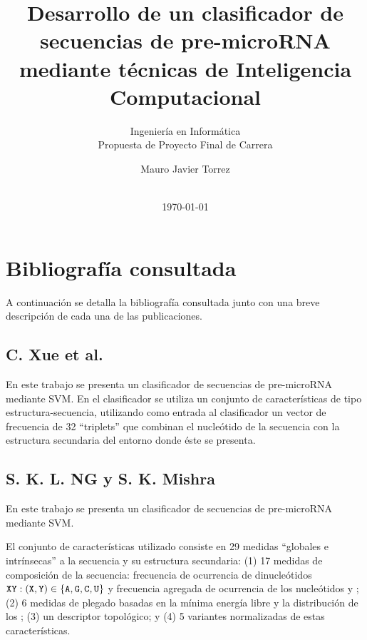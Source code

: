 \documentclass[12pt,bibliography=openstyle,DIV=12,parskip=half-]{scrartcl}
\begin{document}
%
\begin{titlepage}
%
\titlehead{\center Universidad Nacional del Litoral\\
  Facultad de Ingeniería y Ciencias Hídricas}
%
\subtitle{Ingeniería en Informática\\
  Propuesta de Proyecto Final de Carrera}
%
\title{Desarrollo de un clasificador de secuencias de pre-microRNA
  mediante técnicas de Inteligencia Computacional}
\subject{Informe entregable 1}
\author{Mauro Javier Torrez}
%
\publishers{\-\\[4em]{Director\\Dr. Diego H. Milone}\\[2em]
  {Asesora temática\\Dra. Georgina S. Stegmayer}}
%
\date{\-\\[2em]\today}
%
\renewcommand*{\titlepagestyle}{empty}
\maketitle
\end{titlepage}
\setcounter{page}{1}
%
%
%
%
\section{Bibliografía consultada}
%
A continuación se detalla la bibliografía consultada junto con una
breve descripción de cada una de las publicaciones.
%
\subsection{C. Xue et al. \cite{xue}}
%
En este trabajo se presenta un clasificador de secuencias de
pre-microRNA mediante SVM.  En el clasificador se utiliza un conjunto
de características de tipo estructura-secuencia, utilizando como
entrada al clasificador un vector de frecuencia de 32 ``triplets'' que
combinan el nucleótido de la secuencia con la estructura secundaria
del entorno donde éste se presenta.
%
\subsection{S. K. L. NG y S. K. Mishra \cite{ng}}
%
En este trabajo se presenta un clasificador de secuencias de
pre-microRNA mediante SVM.

El conjunto de características utilizado consiste en 29 medidas
``globales e intrínsecas'' a la secuencia y su estructura secundaria:
(1) 17 medidas de composición de la secuencia: frecuencia de
ocurrencia de dinucleótidos
${\tt XY}:({\tt X},{\tt Y})\in\{{\tt A},{\tt G},{\tt C},{\tt U}\}$
y frecuencia agregada de ocurrencia de los nucleótidos  y
; (2) 6 medidas de plegado basadas en la mínima energía libre
y la distribución de los ; (3) un descriptor
topológico; y (4) 5 variantes normalizadas de estas características.
\end{document}
